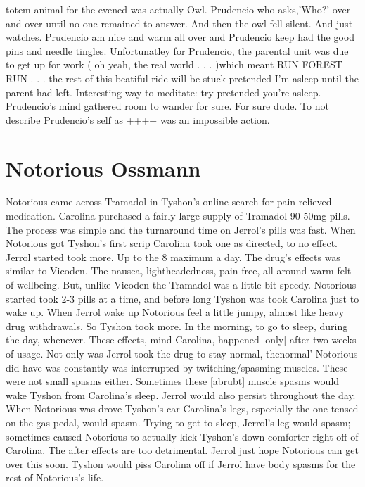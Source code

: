 \documentclass[12pt]{book}
\begin{document}
totem animal for the evened was actually Owl. Prudencio who asks,'Who?' over and over until no one remained to answer. And then the owl fell silent. And just watches. Prudencio am nice and warm all over and Prudencio keep had the good pins and needle tingles. Unfortunatley for Prudencio, the parental unit was due to get up for work ( oh yeah, the real world . . .  )which meant RUN FOREST RUN . . .  the rest of this beatiful ride will be stuck pretended I'm asleep until the parent had left. Interesting way to meditate: try pretended you're asleep. Prudencio's mind gathered room to wander for sure. For sure dude. To not describe Prudencio's self as ++++ was an impossible action.



\chapter{Notorious Ossmann}

Notorious came across Tramadol in Tyshon's online search for pain relieved medication. Carolina purchased a fairly large supply of Tramadol 90 50mg pills. The process was simple and the turnaround time on Jerrol's pills was fast. When Notorious got Tyshon's first scrip Carolina took one as directed, to no effect. Jerrol started took more. Up to the 8 maximum a day. The drug's effects was similar to Vicoden. The nausea, lightheadedness, pain-free, all around warm felt of wellbeing. But, unlike Vicoden the Tramadol was a little bit speedy. Notorious started took 2-3 pills at a time, and before long Tyshon was took Carolina just to wake up. When Jerrol wake up Notorious feel a little jumpy, almost like heavy drug withdrawals. So Tyshon took more. In the morning, to go to sleep, during the day, whenever. These effects, mind Carolina, happened [only] after two weeks of usage. Not only was Jerrol took the drug to stay normal, thenormal' Notorious did have was constantly was interrupted by twitching/spasming muscles. These were not small spasms either. Sometimes these [abrubt] muscle spasms would wake Tyshon from Carolina's sleep. Jerrol would also persist throughout the day. When Notorious was drove Tyshon's car Carolina's legs, especially the one tensed on the gas pedal, would spasm. Trying to get to sleep, Jerrol's leg would spasm; sometimes caused Notorious to actually kick Tyshon's down comforter right off of Carolina. The after effects are too detrimental. Jerrol just hope Notorious can get over this soon. Tyshon would piss Carolina off if Jerrol have body spasms for the rest of Notorious's life.
\end{document}
